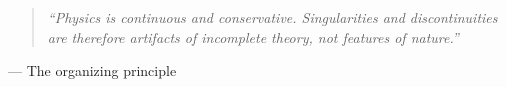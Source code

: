 \thispagestyle{empty}
\vspace*{\fill}
\begin{quote}
\itshape
``Physics is continuous and conservative. Singularities and discontinuities are
therefore artifacts of incomplete theory, not features of nature.''
\end{quote}
\begin{flushright}
--- The organizing principle
\end{flushright}
\vspace*{\fill}
\clearpage
